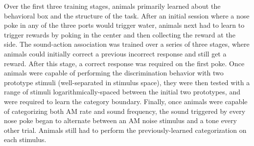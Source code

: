 \begin{table}
{%
Over the first three training stages, animals primarily learned about the behavioral box and the structure of the task.
%
After an initial session where a nose poke in any of the three ports would trigger water, animals next had to learn to trigger rewards by poking in the center and then collecting the reward at the side.
%
The sound-action association was trained over a series of three stages, where animals could initially correct a previous incorrect response and still get a reward.
%
After this stage, a correct response was required on the first poke.
%
Once animals were capable of performing the discrimination behavior with two prototype stimuli (well-separated in stimulus space), they were then tested with a range of stimuli logarithmically-spaced between the initial two prototypes, and were required to learn the category boundary.
%
Finally, once animals were capable of categorizing both AM rate and sound frequency, the sound triggered by every nose poke began to alternate between an AM noise stimulus and a tone every other trial.
%
Animals still had to perform the previously-learned categorization on each stimulus.}
\end{table}



% 

